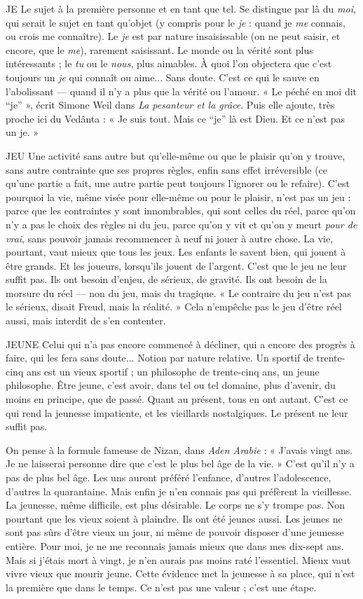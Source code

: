 {JE Le sujet à la première personne et en tant que tel. Se distingue par là du
{\it moi}, qui serait le sujet en tant qu’objet (y compris pour le {\it je} : quand je
{\it me} connais, ou crois me connaître). Le {\it je} est par nature insaisissable (on ne
peut saisir, et encore, que le {\it me}), rarement saisissant. Le monde ou la vérité
sont plus intéressants ; le {\it tu} ou le {\it nous}, plus aimables. À quoi l’on objectera que
c'est toujours un {\it je} qui connaît ou aime... Sans doute. C’est ce qui le sauve en
l’abolissant — quand il n’y a plus que la vérité ou l'amour. « Le péché en moi dit
“je” », écrit Simone Weil dans {\it La pesanteur et la grâce}. Puis elle ajoute, très
proche ici du Vedânta : « Je suis tout. Mais ce “je” là est Dieu. Et ce n’est pas
un je. »

JEU Une activité sans autre but qu’elle-même ou que le plaisir qu'on y
trouve, sans autre contrainte que ses propres règles, enfin sans effet irréversible
(ce qu’une partie a fait, une autre partie peut toujours l’ignorer ou le
refaire). C’est pourquoi la vie, même visée pour elle-même ou pour le plaisir,
n’est pas un jeu : parce que les contraintes y sont innombrables, qui sont celles
du réel, parce qu’on n’y a pas le choix des règles ni du jeu, parce qu’on y vit et
qu’on y meurt {\it pour de vrai}, sans pouvoir jamais recommencer à neuf ni jouer à
autre chose. La vie, pourtant, vaut mieux que tous les jeux. Les enfants le savent
bien, qui jouent à être grands. Et les joueurs, lorsqu'ils jouent de l'argent. C'est
que le jeu ne leur suffit pas. Ils ont besoin d’enjeu, de sérieux, de gravité. Ils ont
besoin de la morsure du réel — non du jeu, mais du tragique. « Le contraire du
jeu n’est pas le sérieux, disait Freud, mais la réalité. » Cela n'empêche pas le jeu
d’être réel aussi, mais interdit de s’en contenter.

JEUNE Celui qui n’a pas encore commencé à décliner, qui a encore des progrès
à faire, qui les fera sans doute... Notion par nature relative. Un
sportif de trente-cinq ans est un vieux sportif ; un philosophe de trente-cinq
ans, un jeune philosophe. Être jeune, c’est avoir, dans tel ou tel domaine, plus
d'avenir, du moins en principe, que de passé. Quant au présent, tous en ont
autant. C’est ce qui rend la jeunesse impatiente, et les vieillards nostalgiques. Le
présent ne leur suffit pas.

On pense à la formule fameuse de Nizan, dans {\it Aden Arabie} : « J'avais vingt
ans. Je ne laisserai personne dire que c’est le plus bel âge de la vie. » C’est qu'il
n’y a pas de plus bel âge. Les uns auront préféré l'enfance, d’autres l’adolescence,
d’autres la quarantaine. Mais enfin je n’en connais pas qui préfèrent la
vieillesse. La jeunesse, même difficile, est plus désirable. Le corps ne s’y trompe
pas. Non pourtant que les vieux soient à plaindre. Ils ont été jeunes aussi. Les
jeunes ne sont pas sûrs d’être vieux un jour, ni même de pouvoir disposer d’une
jeunesse entière. Pour moi, je ne me reconnais jamais mieux que dans mes
dix-sept ans. Mais si j'étais mort à vingt, je n’en aurais pas moins raté l’essentiel.
Mieux vaut vivre vieux que mourir jeune. Cette évidence met la jeunesse à
sa place, qui n’est la première que dans le temps. Ce n’est pas une valeur ; c'est
une étape.

}

